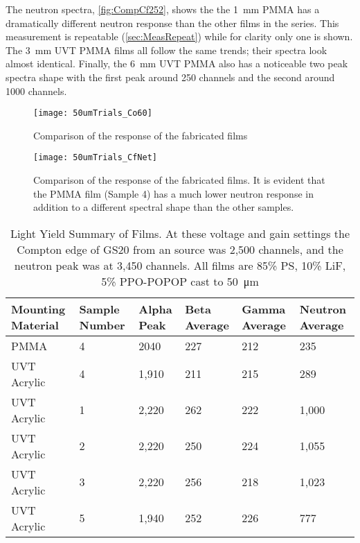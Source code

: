 \documentclass[draftcls,onecolumn]{IEEEtran}
\begin{document}
The neutron spectra, \autoref{fig:CompCf252}, shows the the \SI{1}{\mm} PMMA has a dramatically different neutron response than the other films in the series.
This measurement is repeatable (\autoref{sec:MeasRepeat}) while for clarity only one is shown.
The \SI{3}{\mm} UVT PMMA films all follow the same trends; their spectra look almost identical.
Finally, the \SI{6}{\mm} UVT PMMA also has a noticeable two peak spectra shape with the first peak around 250 channels and the second around 1000 channels.
\begin{figure}[ht]
  \centering
  \texttt{[image: 50umTrials\_Co60]}
  \caption[Fabricated Film Comparison (Gamma)]{Comparison of the response of the fabricated films}
  \label{fig:CompCo60}
\end{figure}
\begin{figure}[ht]
  \centering
  \texttt{[image: 50umTrials\_CfNet]}
  \caption[Fabricated Film Comparison (Neutron)]{Comparison of the  response of the fabricated films. It is evident that the PMMA film (Sample 4) has a much lower neutron response in addition to a different spectral shape than the other samples.}
  \label{fig:CompCf252}
\end{figure}
\begin{table}
\centering
\caption[Summary of Film Light Yield]{Light Yield Summary of Films. At these voltage and gain settings the Compton edge of GS20 from an  source was 2,500 channels, and the neutron peak was at 3,450 channels. All films are 85\% PS, 10\% LiF, 5\% PPO-POPOP cast to \SI{50}{\um}}
  \begin{tabular}{m{2cm} m{2cm} m{2cm} m{2cm} m{2cm} m{2cm}}
  \toprule
  Mounting Material	&	Sample Number	&	Alpha Peak	&	Beta Average	&	Gamma Average	&	Neutron Average	\\
  \midrule
  PMMA	&	4	&	2040	&	227	&	212	&	235	\\
  UVT Acrylic	&	4	&	1,910	&	211	&	215	&	289	\\
  UVT Acrylic	&	1	&	2,220	&	262	&	222	&	1,000	\\
  UVT Acrylic	&	2	&	2,220	&	250	&	224	&	1,055	\\
  UVT Acrylic	&	3	&	2,220	&	256	&	218	&	1,023	\\
  UVT Acrylic	&	5	&	1,940	&	252	&	226	&	777	\\
  \bottomrule
  \end{tabular}
\end{table}
\end{document}
